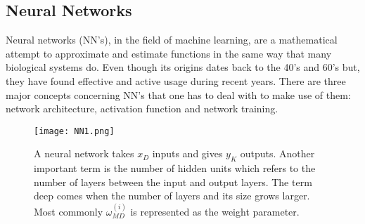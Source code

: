 \subsection{Neural Networks}
Neural networks (NN's), in the field of machine learning, are a mathematical attempt to approximate and estimate functions in the same way that many biological systems do. Even though its origins dates back to the 40's and 60's but, they have found effective and active usage during recent years. There are three major concepts concerning NN's that one has to deal with to make use of them:  network architecture, activation function and network training.
\begin{figure}[tb] 
\centering 
\texttt{[image: NN1.png]} 
\caption[Neural network example architecture]{A neural network takes $x_D$ inputs and gives $y_K$ outputs. Another important term is the number of hidden units which refers to the number of layers between the input and output layers. The term deep comes when the number of layers and its size grows larger. Most commonly $\omega_{MD}^{(i)}$ is represented as the weight parameter.}
\label{fig:NNim1} 
\end{figure} 
